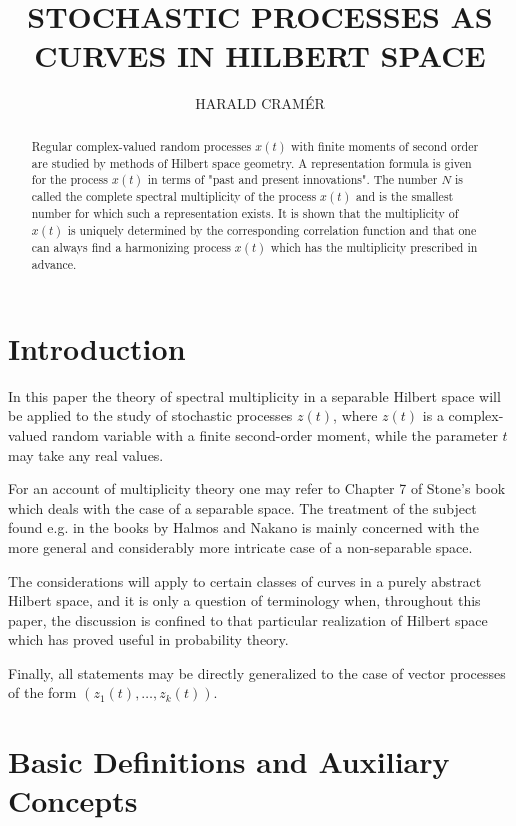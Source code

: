 \documentclass[11pt]{article}
\title{STOCHASTIC PROCESSES AS CURVES IN HILBERT SPACE}
\author{HARALD CRAM\'ER}
\date{}
\begin{document}
\maketitle

\begin{abstract}
Regular complex-valued random processes $x(t)$ with finite moments of second order are studied by methods of Hilbert space geometry. A representation formula is given for the process $x(t)$ in terms of "past and present innovations". The number $N$ is called the complete spectral multiplicity of the process $x(t)$ and is the smallest number for which such a representation exists. It is shown that the multiplicity of $x(t)$ is uniquely determined by the corresponding correlation function and that one can always find a harmonizing process $x(t)$ which has the multiplicity prescribed in advance.
\end{abstract}

\section{Introduction}

In this paper the theory of spectral multiplicity in a separable Hilbert space will be applied to the study of stochastic processes $z(t)$, where $z(t)$ is a complex-valued random variable with a finite second-order moment, while the parameter $t$ may take any real values.

For an account of multiplicity theory one may refer to Chapter 7 of Stone's book \cite{stone1932} which deals with the case of a separable space. The treatment of the subject found e.g. in the books by Halmos \cite{halmos1957} and Nakano \cite{nakano1953} is mainly concerned with the more general and considerably more intricate case of a non-separable space.

The considerations will apply to certain classes of curves in a purely abstract Hilbert space, and it is only a question of terminology when, throughout this paper, the discussion is confined to that particular realization of Hilbert space which has proved useful in probability theory.

Finally, all statements may be directly generalized to the case of vector processes of the form $(z_1(t), \ldots, z_k(t))$.

\section{Basic Definitions and Auxiliary Concepts}
\end{document}
